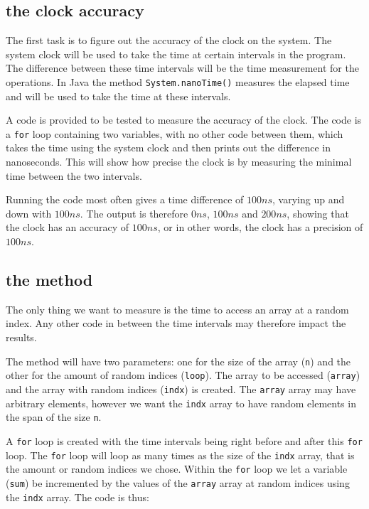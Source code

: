 \documentclass[a4paper,11pt]{article}
\begin{document}
\subsection*{the clock accuracy}

The first task is to figure out the accuracy of the clock on the system.
The system clock will be used to take the time at certain intervals in
the program. The difference between these time intervals will be the
time measurement for the operations. In Java the method
{\tt System.nanoTime()} measures the elapsed time and will be used to 
take the time at these intervals.

A code is provided to be tested to measure the accuracy of the clock.
The code is a {\tt for} loop containing two variables, with no other 
code between them, which takes the time using the system clock and then 
prints out the difference in nanoseconds. This will show how precise
the clock is by measuring the minimal time between the two intervals.

Running the code most often gives a time difference of $100 ns$,
varying up and down with $100 ns$. The output is therefore $0 ns$, 
$100 ns$ and $200 ns$, showing that the clock has an accuracy of 
$100 ns$, or in other words, the clock has a precision of $100 ns$.

\subsection*{the method}

The only thing we want to measure is the time to access an array at a
random index. Any other code in between the time intervals may therefore 
impact the results.

The method will have two parameters: one for the size of the array 
({\tt n}) and the other for the amount of random indices ({\tt loop}).
The array to be accessed ({\tt array}) and the array with random indices
({\tt indx}) is created. The {\tt array} array may have arbitrary
elements, however we want the {\tt indx} array to have random elements
in the span of the size {\tt n}.

A {\tt for} loop is created with the time intervals being right before
and after this {\tt for} loop. The {\tt for} loop will loop as many
times as the size of the {\tt indx} array, that is the amount or random
indices we chose. Within the {\tt for} loop we let a variable 
({\tt sum}) be incremented by the values of the {\tt array} array at 
random indices using the {\tt indx} array. The code is thus:
\end{document}
